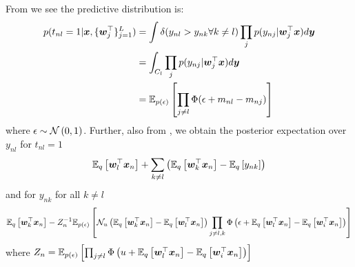 From \cite{Girolami2007} we see the predictive distribution is:
\begin{align}
p(t_{nl} = 1 | \vv{x}, \{ \vv{w}_j\T \}_{j=1}^L) & =
\int \delta (y_{nl} > y_{nk} \forall k \neq l) \prod_j p(y_{nj} | \vv{w}_j\T\vv{x}) d\vv{y} \\
&= \int_{C_l} \prod_j p(y_{nj} | \vv{w}_j\T\vv{x}) d\vv{y} \\
&= \ex{\prod_{j \neq l} \Phi(\epsilon + m_{nl} - m_{nj})}{p(\epsilon)}
\end{align}
where $\epsilon \sim \nor{0}{1}$. Further, also from \cite{Girolami2007}, we obtain the posterior expectation over $y_{nl}$ for $t_{nl} = 1$
\begin{align}
\ex{\vv{w}_l\T\vv{x}_n}{q} + \sum_{k \neq l} \left(\ex{\vv{w}_k\T\vv{x}_n}{q} - \ex{y_{nk}}{q}\right)
\end{align}
and for $y_{nk}$ for all $k \neq l$
\begin{align}
\ex{\vv{w}_k\T\vv{x}_n}{q} - Z_n^{-1}\ex{\mathcal{N}_u\left(\ex{\vv{w}_k\T\vv{x}_n}{q} - \ex{\vv{w}_l\T\vv{x}_n}{q} \right) \prod_{j \neq l,k}\Phi\left(\epsilon + \ex{\vv{w}_l\T\vv{x}_n}{q} - \ex{\vv{w}_i\T\vv{x}_n}{q} \right) }{p(\epsilon)} 
\end{align}
where $Z_n = \ex{\prod_{j \neq l}\Phi\left(u + \ex{\vv{w}_l\T\vv{x}_n}{q} - \ex{\vv{w}_i\T\vv{x}_n}{q} \right) }{p(\epsilon)}$




